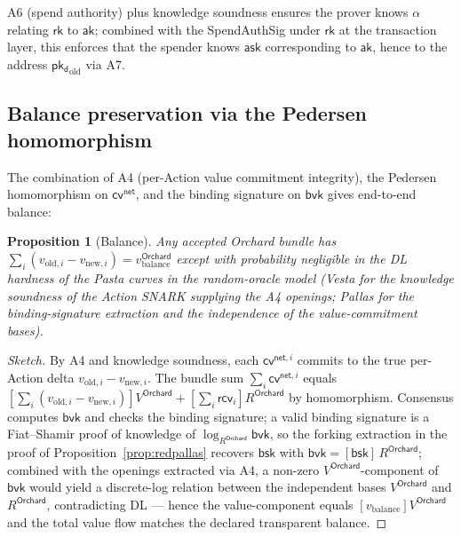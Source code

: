 \documentclass[11pt,a4paper]{article}
\newtheorem{proposition}[theorem]{Proposition}
\theoremstyle{definition}
\newcommand{\cvsym}{\mathsf{cv}}
\newcommand{\rk}{\mathsf{rk}}
\newcommand{\ask}{\ensuremath{\mathsf{ask}}}
\newcommand{\aksym}{\ensuremath{\mathsf{ak}}}
\newcommand{\pkd}{\ensuremath{\mathsf{pk_d}}}
\newcommand{\rcv}{\ensuremath{\mathsf{rcv}}}
\begin{document}
A6 (spend authority) plus knowledge soundness ensures the prover knows
$\alpha$ relating $\rk$ to $\aksym$; combined with the SpendAuthSig
under $\rk$ at the transaction layer, this enforces that the spender
knows $\ask$ corresponding to $\aksym$, hence to the address
$\pkd_{\mathrm{old}}$ via A7.

\subsection{Balance preservation via the Pedersen homomorphism}\label{sec:balance}

The combination of A4 (per-Action value commitment integrity), the
Pedersen homomorphism on $\cvsym^{\mathsf{net}}$, and the binding
signature on $\mathsf{bvk}$ gives end-to-end balance:

\begin{proposition}[Balance]\label{prop:balance}
Any accepted Orchard bundle has
$\sum_i (v_{\mathrm{old}, i} - v_{\mathrm{new}, i}) = v_{\mathrm{balance}}^{\mathsf{Orchard}}$
except with probability negligible in the DL hardness of the Pasta
curves in the random-oracle model (Vesta for the knowledge soundness of
the Action SNARK supplying the A4 openings; Pallas for the
binding-signature extraction and the independence of the
value-commitment bases).
\end{proposition}

\begin{proof}[Sketch]
By A4 and knowledge soundness, each $\cvsym^{\mathsf{net}, i}$ commits
to the true per-Action delta $v_{\mathrm{old}, i} - v_{\mathrm{new}, i}$.
The bundle sum $\sum_i \cvsym^{\mathsf{net}, i}$ equals $[\sum_i (v_{\mathrm{old}, i} - v_{\mathrm{new}, i})] V^{\mathsf{Orchard}} + [\sum_i \rcv_i] R^{\mathsf{Orchard}}$
by homomorphism. Consensus computes $\mathsf{bvk}$ and checks the
binding signature; a valid binding signature is a Fiat--Shamir proof of
knowledge of $\log_{R^{\mathsf{Orchard}}} \mathsf{bvk}$, so the forking
extraction in the proof of Proposition~\ref{prop:redpallas} recovers
$\mathsf{bsk}$ with $\mathsf{bvk} = [\mathsf{bsk}]\, R^{\mathsf{Orchard}}$;
combined with the openings extracted via A4, a non-zero
$V^{\mathsf{Orchard}}$-component of $\mathsf{bvk}$ would yield a
discrete-log relation between the independent bases $V^{\mathsf{Orchard}}$
and $R^{\mathsf{Orchard}}$, contradicting DL --- hence the value-component
equals $[v_{\mathrm{balance}}] V^{\mathsf{Orchard}}$ and the total value
flow matches the declared transparent balance.
\end{proof}
\end{document}
